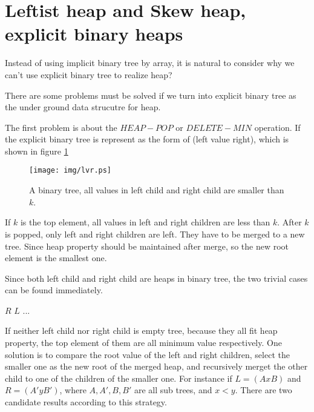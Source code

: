 \documentclass{article}
\begin{document}
\section{Leftist heap and Skew heap, explicit binary heaps}
\label{ebheap}

Instead of using implicit binary tree by array, it is natural to
consider why we can't use explicit binary tree to realize heap?

There are some problems must be solved if we turn into explicit
binary tree as the under ground data strucutre for heap.

The first problem is about the $HEAP-POP$ or $DELETE-MIN$ operation.
If the explicit binary tree is represent as the form of
(left value right), which is shown in figure \ref{fig:lvr}

\begin{figure}[htbp]
       \begin{center}
       	  \texttt{[image: img/lvr.ps]}
        \caption{A binary tree, all values in left child and right child are smaller than $k$.} \label{fig:lvr}
       \end{center}
\end{figure}

If $k$ is the top element, all values in left and right children are less
than $k$. After $k$ is popped, only left and right children are left.
They have to be merged to a new tree. Since heap property should be maintained
after merge, so the new root element is the smallest one.

Since both left child and right child are heaps in binary tree, the two trivial
cases can be found immediately.

\begin{algorithmic}[1]
    \State \Return $R$
    \State \Return $L$
  \Else
    \State $...$
  \EndIf
\EndFunction
\end{algorithmic}

If neither left child nor right child is empty tree, because they all fit
heap property, the top element of them are all minimum value respectively.
One solution is to compare the root value of the left and right children,
select the smaller one as the new root of the merged heap, and recursively
merget the other child to one of the children of the smaller one.
For instance if $L = (A x B)$ and $R = (A' y B')$, where $A, A', B, B'$
are all sub trees, and $x < y$. There are two candidate results according
to this strategy.
\end{document}
